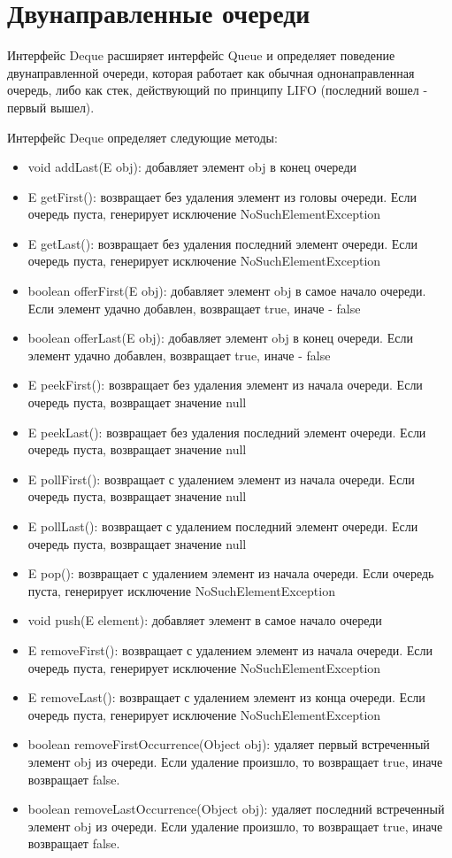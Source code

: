 \section{Двунаправленные очереди}

Интерфейс Deque расширяет интерфейс Queue и определяет поведение двунаправленной очереди, которая работает как обычная однонаправленная очередь, либо как стек, действующий по принципу LIFO (последний вошел - первый вышел).

Интерфейс Deque определяет следующие методы:

\begin{itemize}
\item void addLast(E obj): добавляет элемент obj в конец очереди
\item E getFirst(): возвращает без удаления элемент из головы очереди. Если очередь пуста, генерирует исключение NoSuchElementException
\item E getLast(): возвращает без удаления последний элемент очереди. Если очередь пуста, генерирует исключение NoSuchElementException
\item boolean offerFirst(E obj): добавляет элемент obj в самое начало очереди. Если элемент удачно добавлен, возвращает true, иначе - false
\item boolean offerLast(E obj): добавляет элемент obj в конец очереди. Если элемент удачно добавлен, возвращает true, иначе - false
\item E peekFirst(): возвращает без удаления элемент из начала очереди. Если очередь пуста, возвращает значение null
\item E peekLast(): возвращает без удаления последний элемент очереди. Если очередь пуста, возвращает значение null
\item E pollFirst(): возвращает с удалением элемент из начала очереди. Если очередь пуста, возвращает значение null
\item E pollLast(): возвращает с удалением последний элемент очереди. Если очередь пуста, возвращает значение null
\item E pop(): возвращает с удалением элемент из начала очереди. Если очередь пуста, генерирует исключение NoSuchElementException
\item void push(E element): добавляет элемент в самое начало очереди
\item E removeFirst(): возвращает с удалением элемент из начала очереди. Если очередь пуста, генерирует исключение NoSuchElementException
\item E removeLast(): возвращает с удалением элемент из конца очереди. Если очередь пуста, генерирует исключение NoSuchElementException
\item boolean removeFirstOccurrence(Object obj): удаляет первый встреченный элемент obj из очереди. Если удаление произшло, то возвращает true, иначе возвращает false.
\item boolean removeLastOccurrence(Object obj): удаляет последний встреченный элемент obj из очереди. Если удаление произшло, то возвращает true, иначе возвращает false.
\end{itemize}


